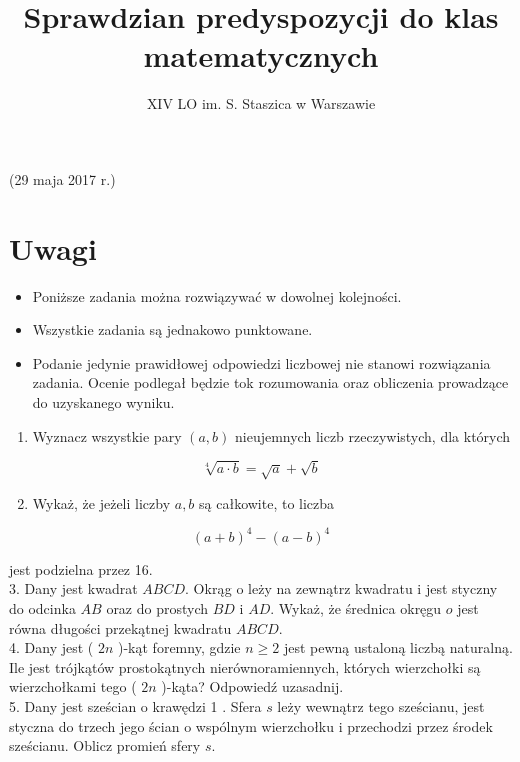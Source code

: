 \documentclass[10pt]{article}
\title{Sprawdzian predyspozycji do klas matematycznych }
\author{XIV LO im. S. Staszica w Warszawie}
\date{}
\begin{document}
\maketitle
(29 maja 2017 r.)

\section*{Uwagi}
\begin{itemize}
  \item Poniższe zadania można rozwiązywać w dowolnej kolejności.
  \item Wszystkie zadania są jednakowo punktowane.
  \item Podanie jedynie prawidłowej odpowiedzi liczbowej nie stanowi rozwiązania zadania. Ocenie podlegał będzie tok rozumowania oraz obliczenia prowadzące do uzyskanego wyniku.
\end{itemize}

\begin{enumerate}
  \item Wyznacz wszystkie pary \((a, b)\) nieujemnych liczb rzeczywistych, dla których
\end{enumerate}

\[
\sqrt[4]{a \cdot b}=\sqrt{a}+\sqrt{b}
\]

\begin{enumerate}
  \setcounter{enumi}{1}
  \item Wykaż, że jeżeli liczby \(a, b\) są całkowite, to liczba
\end{enumerate}

\[
(a+b)^{4}-(a-b)^{4}
\]

jest podzielna przez 16.\\
3. Dany jest kwadrat \(A B C D\). Okrąg o leży na zewnątrz kwadratu i jest styczny do odcinka \(A B\) oraz do prostych \(B D\) i \(A D\). Wykaż, że średnica okręgu \(o\) jest równa długości przekątnej kwadratu \(A B C D\).\\
4. Dany jest ( \(2 n\) )-kąt foremny, gdzie \(n \geqslant 2\) jest pewną ustaloną liczbą naturalną. Ile jest trójkątów prostokątnych nierównoramiennych, których wierzchołki są wierzchołkami tego ( \(2 n\) )-kąta? Odpowiedź uzasadnij.\\
5. Dany jest sześcian o krawędzi 1 . Sfera \(s\) leży wewnątrz tego sześcianu, jest styczna do trzech jego ścian o wspólnym wierzchołku i przechodzi przez środek sześcianu. Oblicz promień sfery \(s\).
\end{document}
